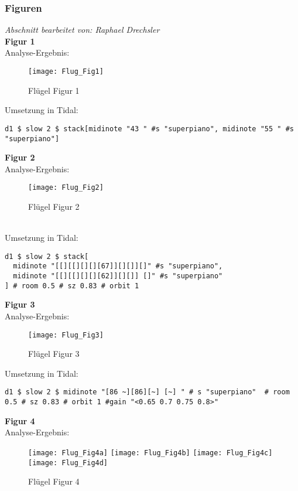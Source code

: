 \documentclass[
10pt, %
a4paper, %
oneside, %
headinclude,footinclude, %
BCOR5mm, %
]{scrartcl}
\begin{document}
\subsubsection{Figuren}
\textit{Abschnitt bearbeitet von: Raphael Drechsler}\\

\noindent\textbf{Figur 1}\\
Analyse-Ergebnis:
\begin{figure}[h]
	\centering 
	\texttt{[image: Flug\_Fig1]} 
	\caption{Flügel Figur 1}
\end{figure}
\noindent Umsetzung in Tidal:
\begin{lstlisting}
d1 $ slow 2 $ stack[midinote "43 " #s "superpiano", midinote "55 " #s "superpiano"]
\end{lstlisting}

\noindent \textbf{Figur 2}\\
Analyse-Ergebnis:\\
\begin{figure}[h]
	\centering 
	\texttt{[image: Flug\_Fig2]} 
	\caption{Flügel Figur 2}
\end{figure}\\
\noindent Umsetzung in Tidal:
\begin{lstlisting}
d1 $ slow 2 $ stack[
  midinote "[[][[][][][67]][][]][]" #s "superpiano",
  midinote "[[][[][][][62]][][]] []" #s "superpiano"
] # room 0.5 # sz 0.83 # orbit 1
\end{lstlisting}

\noindent \textbf{Figur 3}\\
Analyse-Ergebnis:
\begin{figure}[h]
	\centering 
	\texttt{[image: Flug\_Fig3]} 
	\caption{Flügel Figur 3}
\end{figure}

\noindent Umsetzung in Tidal:
\begin{lstlisting}
d1 $ slow 2 $ midinote "[86 ~][86][~] [~] " # s "superpiano"  # room 0.5 # sz 0.83 # orbit 1 #gain "<0.65 0.7 0.75 0.8>"
\end{lstlisting}


\noindent \textbf{Figur 4}\\
Analyse-Ergebnis:
\begin{figure}[h]
	\centering 
	\texttt{[image: Flug\_Fig4a]} 
	\texttt{[image: Flug\_Fig4b]} 
	\texttt{[image: Flug\_Fig4c]} 
	\texttt{[image: Flug\_Fig4d]} 
	\caption{Flügel Figur 4}
\end{figure}
\end{document}
